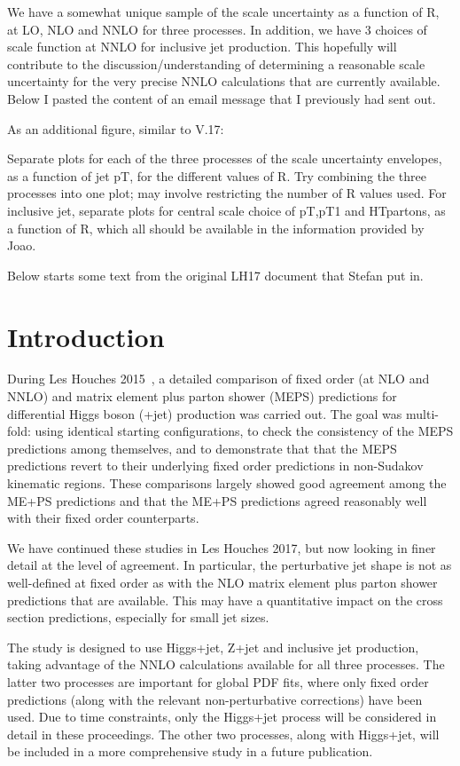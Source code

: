 \documentclass[aps,prd,onecolumn,fleqn,superscriptaddress,groupedaddress,nofootinbib,preprintnumbers,nobalancelastpage]{revtex4}
\begin{document}
We have a somewhat unique sample of the scale uncertainty as a function of R, at LO, NLO and NNLO for three processes. In addition, we have 3 choices of scale function at NNLO for inclusive jet production. This hopefully will contribute to the discussion/understanding of determining a reasonable scale uncertainty for the very precise NNLO calculations that are currently available. Below I pasted the content of an email message that I previously had sent out. 

As an additional figure, similar to V.17:

Separate plots for each of the three processes of  the scale uncertainty envelopes, as a function of jet pT, for the different values of R. Try combining the three processes into one plot; may involve restricting the number of R values used. For inclusive jet, separate plots for central scale choice of pT,pT1
and HTpartons, as a function of R, which all should be available in the information provided by Joao. 

Below starts some text from the original LH17 document that Stefan put in. 

\section{Introduction}
During Les Houches 2015~\cite{Badger:2016bpw}, a detailed 
comparison of fixed order (at NLO and NNLO) and matrix element plus parton shower (MEPS) predictions for differential Higgs
boson (+jet) production was carried out. The goal was multi-fold: using identical
starting configurations, to check the consistency of the MEPS
predictions among themselves, and to demonstrate that that the MEPS
predictions revert to their underlying fixed order predictions in
non-Sudakov kinematic regions. 
These comparisons largely showed good agreement among the ME+PS predictions and 
 that the ME+PS predictions agreed reasonably well with their fixed order counterparts. 

We have continued these studies in Les Houches 2017, but now looking in finer detail at 
the level of agreement. In particular, the perturbative jet shape is not as
well-defined at fixed order as with the NLO matrix element plus parton shower
predictions that are available. This may have a quantitative impact on the cross
section predictions, especially for small jet sizes.   

The study is designed to use Higgs+jet, Z+jet and inclusive jet production,
taking advantage of the NNLO calculations available for all three processes.
The latter two processes are important for global PDF fits, where
only fixed order predictions (along with the relevant non-perturbative
corrections) have been used. 
Due to time constraints, only the Higgs+jet process will be considered in detail
in these proceedings. The other two processes, along with Higgs+jet,  will be
included in a more comprehensive study in a future publication. 
\end{document}

